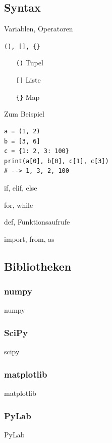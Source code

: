 \subsection{Syntax}
\begin{frame}{Variablen, Operatoren}
\end{frame}

\begin{frame}[fragile]{\texttt{(), [], \{\}}}
  \begin{itemize}
    \item[\texttt{()}] Tupel
    \item[\texttt{[]}] Liste
    \item[\texttt{\{\}}] Map 
  \end{itemize}
  \vspace{.5em}
  \begin{spacing}{1.0}
    \begin{exampleblock}{Zum Beispiel}
      \begin{verbatim}
a = (1, 2)
b = [3, 6]
c = {1: 2, 3: 100}
print(a[0], b[0], c[1], c[3])
# --> 1, 3, 2, 100
      \end{verbatim}
    \end{exampleblock}
  \end{spacing}
\end{frame}

\begin{frame}{if, elif, else}
\end{frame}

\begin{frame}{for, while}
\end{frame}

\begin{frame}{def, Funktionsaufrufe}
\end{frame}

\begin{frame}{import, from, as}
\end{frame}

\subsection{Bibliotheken}
\subsubsection{numpy}
\begin{frame}{numpy}
\end{frame}

\subsubsection{SciPy}
\begin{frame}{scipy}
\end{frame}

\subsubsection{matplotlib}
\begin{frame}{matplotlib}
\end{frame}

\subsubsection{PyLab}
\begin{frame}{PyLab}
\end{frame}
